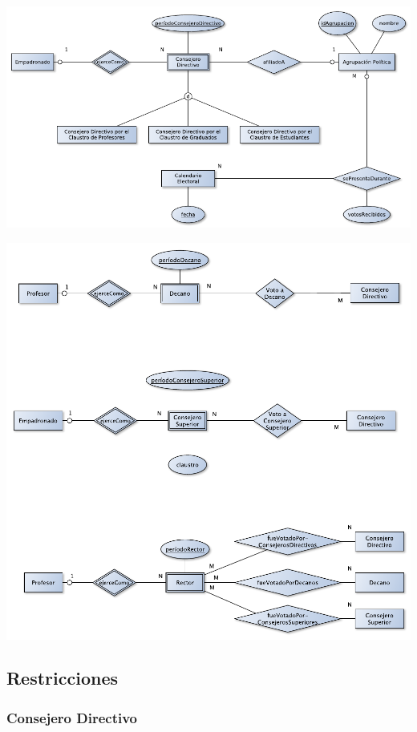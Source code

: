 \documentclass[a4paper, 10pt, twoside]{article}
\begin{document}
\includegraphics{../diagramas/eleccionesCD.pdf}

\includegraphics{../diagramas/gobiernoSuperior.pdf}


\subsection{Restricciones}


\subsubsection{Consejero Directivo}
\end{document}
